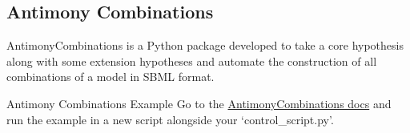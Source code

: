 \documentclass[../../main]{subfiles}
\begin{document}
    \subsection{Antimony Combinations}
    AntimonyCombinations is a Python package developed to take a core hypothesis along with some extension
    hypotheses and automate the construction of all combinations of a model in SBML format.

    \begin{Task}[label=AntimonyCombinations]{Antimony Combinations Example}
        Go to the \href{https://antimonycombinations.readthedocs.io/en/latest/}{AntimonyCombinations docs} and run the
        example in a new script alongside your `control\_script.py'.
    \end{Task}

\end{document}
